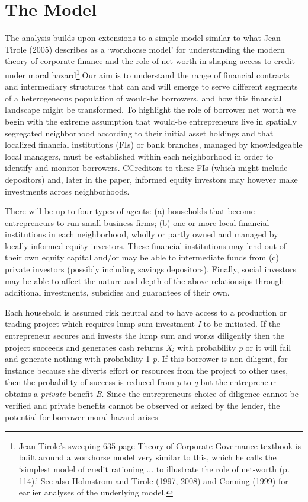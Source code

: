 \documentclass{article} %
\begin{document}
\noindent 
\section{The Model}

\noindent The analysis builds upon extensions to a simple model similar to what Jean Tirole (2005) describes as a `workhorse model' for understanding the modern theory of corporate finance and the role of net-worth in shaping access to credit under moral hazard\footnote{  Jean Tirole's sweeping 635-page  Theory of Corporate Governance textbook is built around a workhorse model very similar to this, which he calls the `simplest model of credit rationing ... to illustrate the role of net-worth (p. 114).' See also Holmstrom and Tirole (1997, 2008) and Conning (1999) for earlier analyses of the underlying model. }.Our aim is to understand the range of financial contracts and intermediary structures that can and will emerge to serve different segments of a heterogeneous population of would-be borrowers, and how this financial landscape might be transformed.  To highlight the role of borrower net worth we begin with the extreme assumption that would-be entrepreneurs live in spatially segregated neighborhood according to their initial asset holdings and that localized financial institutions (FIs) or bank branches, managed by knowledgeable local managers, must be established within each neighborhood in order to identify and monitor borrowers. CCreditors to these FIs (which might include  depositors) and, later in the paper, informed equity investors may however make investments across neighborhoods. 

There will be up to four types of agents: (a) households that become entrepreneurs to run small business firms; (b) one or more local financial institutions in each neighborhood, wholly or partly owned and managed by locally informed equity investors. These financial institutions may lend out of their own equity capital and/or may be able to intermediate funds from (c) private investors (possibly including savings depositors). Finally, social investors may be able to affect the nature and depth of the above relationsips through additional investments, subsidies and guarantees of their own. 

Each household is assumed risk neutral and to have access to a production or trading project which requires lump sum investment \textit{I} to be initiated. If the entrepreneur secures and invests the lump sum and works diligently then the project succeeds and generates cash returns \textit{X${}_{i}$} with probability \textit{p} or it will fail and generate nothing with probability 1-\textit{p}.  If this borrower is non-diligent, for instance because she diverts effort or resources from the project to other uses, then the probability of success is reduced from \textit{p} to \textit{q} but the entrepreneur obtains a \textit{private} benefit \textit{B}.  Since the entrepreneurs choice of diligence cannot be verified and private benefits cannot be observed or seized by the lender, the potential for borrower moral hazard arises
\end{document}
